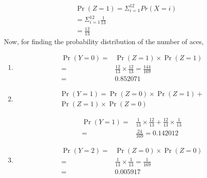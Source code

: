 \begin{align}
    \Pr(Z=1) = \Sigma_{i=1}^{12} Pr(X=i)
    \\ = \Sigma_{i=1}^{12}\frac{1}{13}
    \\ = \frac{12}{13}
\end{align}
Now, for finding the probability distribution of the number of aces, 
\begin{enumerate}
    
\item
\begin{align}
    \Pr(Y=0) = &\Pr(Z=1) \times \Pr(Z=1)
    \\ = &\frac{12}{13} \times \frac{12}{13} = \frac{144}{169}
    \\ = & 0.852071
\end{align}
 

\item 
\begin{multline}
    \Pr(Y=1) = \Pr(Z=0) \times \Pr(Z=1) + 
    \\\Pr(Z=1) \times \Pr(Z=0)
\end{multline} 

\begin{align}
    \Pr(Y=1) = &\frac{1}{13} \times \frac{12}{13} + \frac{12}{13} \times \frac{1}{13}
    \\ = & \frac{24}{169} = 0.142012
\end{align}    
   

\item
\begin{align}
    \Pr(Y=2) = &\Pr(Z=0) \times \Pr(Z=0)
    \\ = &\frac{1}{13} \times \frac{1}{13} = \frac{1}{169}
    \\ = &0.005917
\end{align}
\end{enumerate}
\begin{center}
\begin{table}[h]
    \centering
    \caption{Probability distribution table }
    \label{table 1}
\end{table}
\end{center}

